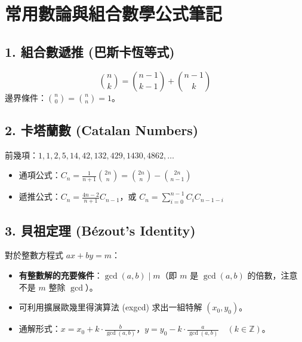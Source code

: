\section*{常用數論與組合數學公式筆記}

\subsection*{1. 組合數遞推 (巴斯卡恆等式)}
$$\binom{n}{k} = \binom{n-1}{k-1} + \binom{n-1}{k}$$
邊界條件：$\binom{n}{0} = \binom{n}{n} = 1$。

\subsection*{2. 卡塔蘭數 (Catalan Numbers)}
前幾項：$1, 1, 2, 5, 14, 42, 132, 429, 1430, 4862, \dots$
\begin{itemize}
    \item 通項公式：$C_n = \frac{1}{n+1}\binom{2n}{n} = \binom{2n}{n} - \binom{2n}{n-1}$
    \item 遞推公式：$C_n = \frac{4n-2}{n+1} C_{n-1}$，或 $C_n = \sum_{i=0}^{n-1} C_i C_{n-1-i}$
\end{itemize}

\subsection*{3. 貝祖定理 (Bézout's Identity)}
對於整數方程式 $ax + by = m$：
\begin{itemize}
    \item \textbf{有整數解的充要條件}：$\gcd(a, b) \mid m$（即 $m$ 是 $\gcd(a, b)$ 的倍數，注意不是 $m$ 整除 $\gcd$）。
    \item 可利用擴展歐幾里得演算法 (exgcd) 求出一組特解 $(x_0, y_0)$。
    \item 通解形式：$x = x_0 + k \cdot \frac{b}{\gcd(a,b)}$，$y = y_0 - k \cdot \frac{a}{\gcd(a,b)} \quad (k \in \mathbb{Z})$。
\end{itemize}

